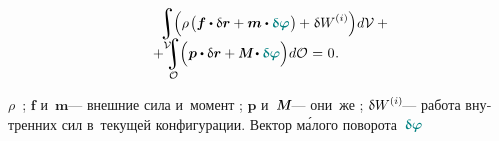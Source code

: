 \begin{otherlanguage}{russian}
\nopagebreak\vspace{-0.3em}\begin{multline}
\hspace*{2em}
\integral\displaylimits_{\mathcal{V}} \hspace{-0.64ex} \left(^{\mathstrut} \hspace{-0.1ex} \rho \hspace{.2ex} \bigl( \bm{f} \dotp \variation{\currentvector} + \bm{m} \dotp \littlerotationvector \hspace{.1ex} \bigr) \hspace{-0.1ex} + \hspace{.1ex} \variation{\internalwork} \hspace{.1ex} \right) \hspace{-0.3ex} d\mathcal{V}
\hspace{.5ex} + \\[-1.2em]
%
+ \integral\displaylimits_{\mathcal{O}} \hspace{-0.64ex} \left(^{\mathstrut} \bm{p} \dotp \variation{\currentvector} + \mathboldM \hspace{-0.1ex} \dotp \littlerotationvector \right) \hspace{-0.3ex} d\mathcal{O} \hspace{.1ex}
= \hspace{.1ex} 0 \hspace{.1ex} .
\hspace*{2em}
\end{multline}

\vspace{-0.2em} \noindent {}
$\rho$~;
$\bm{f}$ и~$\bm{m}$\:--- внешние сила и~момент ;
$\bm{p}$ и~$\mathboldM$\:--- они~же ;
${\variation{\internalwork}\hspace{-0.2ex}}$\:--- работа внутренних сил  в~текущей конфигурации.
Вектор м\'{а}лого поворота~$\littlerotationvector$


\end{otherlanguage}
